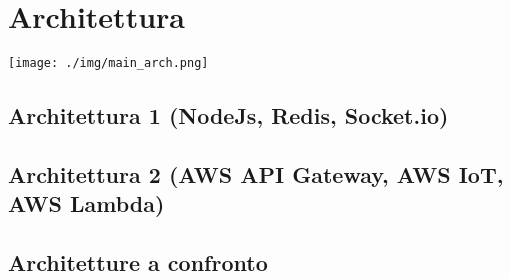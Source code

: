 
\chapter{Architettura}
\noindent\begin{minipage}{1\textwidth}%
\begin{center}

\texttt{[image: ./img/main\_arch.png]}
\end{center}
\end{minipage}


\section{Architettura 1 (NodeJs, Redis, Socket.io)}

\section{Architettura 2 (AWS API Gateway, AWS IoT, AWS Lambda)}

\section{Architetture a confronto}
